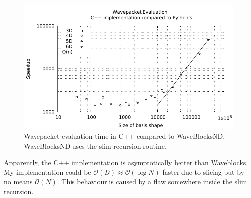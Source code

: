 \documentclass{article}
\begin{document}
\begin{figure}[H]
  \centering
  \includegraphics[width=1.0\textwidth]{plots/hawp_eval_pvc2}
  \caption{Wavepacket evaluation time in C++ compared to WaveBlocksND.
    WaveBlocksND uses the slim recursion routine.}
  \label{fig:hawp_eval_pvc}
\end{figure}

Apparently, the C++ implementation is asymptotically better than Waveblocks.
My implementation could be \(\mathcal{O}(D) \approx \mathcal{O}(\log{}N)\) faster due to slicing but by
no means \(\mathcal{O}(N)\).
This behaviour is caused by a flaw somewhere inside the slim recursion.
\end{document}
